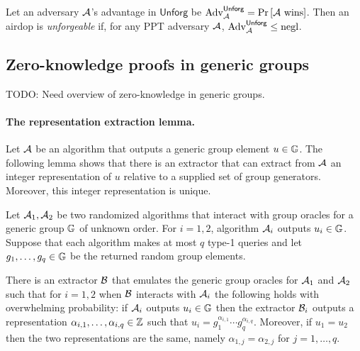 \begin{definition}
Let an adversary $\mathcal{A}$'s advantage in $\mathsf{Unforg}$ be
$\mathrm{Adv}_{\mathcal{A}}^{\mathsf{Unforg}} = \operatorname*{Pr}\left[{\mathcal{A}~\text{wins}}\right]$.
Then an airdop is \emph{unforgeable} if, for any PPT adversary $\mathcal{A}$,
$\mathrm{Adv}_{\mathcal{A}}^{\mathsf{Unforg}} \le \text{negl}$.
\end{definition}


\subsection{Zero-knowledge proofs in generic groups}

TODO: Need overview of zero-knowledge in generic groups. 

\paragraph{The representation extraction lemma.}
Let $\mathcal{A}$ be an algorithm that outputs 
a generic group element $u \in \mathbb G$.
The following lemma shows that there is an extractor that
can extract from $\mathcal{A}$ an integer representation of $u$
relative to a supplied set of group generators.
Moreover, this integer representation is unique.

\begin{lemma}
\label{lem:unique}
Let $\mathcal{A}_1, \mathcal{A}_2$ be two randomized algorithms that interact
with group oracles for a generic group $\mathbb G$ of unknown order.
For $i=1,2$, algorithm $\mathcal{A}_i$ outputs $u_i \in \mathbb G$.
Suppose that each algorithm makes at most $q$ type-1 queries
and let $g_1,\ldots,g_q \in \mathbb G$ be the returned random group elements. 

There is an extractor $\mathcal{B}$ that emulates 
the generic group oracles for $\mathcal{A}_1$ and $\mathcal{A}_2$
such that for $i=1,2$ when $\mathcal{B}$ interacts with $\mathcal{A}_i$ 
the following holds with overwhelming probability:
if $\mathcal{A}_i$ outputs $u_i \in \mathbb G$ 
then the extractor $\mathcal{B}_i$ outputs a representation
$\alpha_{i,1},\ldots,\alpha_{i,q} \in \mathbb Z$
such that $u_i = g_1^{\alpha_{i,1}} \cdots g_q^{\alpha_{i,q}}$.
Moreover, if $u_1 = u_2$ then the two representations are the same,
namely $\alpha_{1,j} = \alpha_{2,j}$ for $j=1,\ldots,q$. 
\end{lemma}

